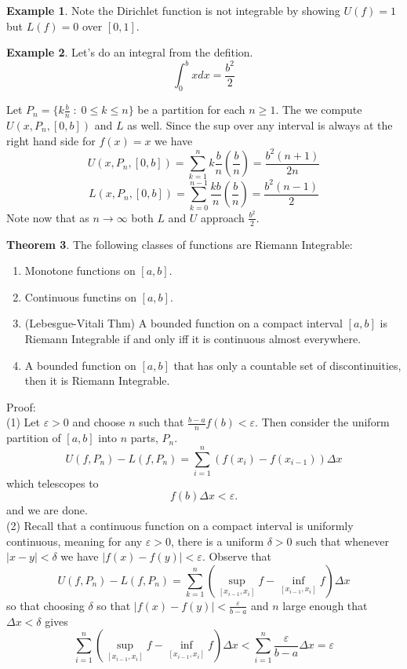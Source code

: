 \documentclass[12pt]{article}
\theoremstyle{definition}
\newtheorem{thm}{Theorem}
\newtheorem{ex}[thm]{Example}
\begin{document}
    \begin{ex}
	Note the Dirichlet function is not integrable by showing $ U(f)=1 $ but $ L(f)=0 $ over $ [0,1] $.
    \end{ex}

    \begin{ex}
    Let's do an integral from the defition.
    $$ \int_{0}^{b} x  dx = \frac{b^2}{2} $$ 
    \end{ex}

    Let $P_n= \{ k \frac{b}{n}\; :\; 0\leq k\leq n \}$ be a partition for each $n\geq 1$.
    The we compute $ U(x,P_n,[0,b]) $ and $ L $ as well.
    Since the sup over any interval is always at the right hand side for $ f(x)=x $ we have 
    $$ U(x,P_n,[0,b])= \sum_{k=1}^{n}k \frac{b}{n} \left( \frac{b}{n} \right) = \frac{b^2(n+1)}{2n}  $$ 
$$ L(x,P_n,[0,b]) = \sum_{k=0}^{n-1} \frac{kb}{n}\left( \frac{b}{n} \right)= \frac{b^2(n-1)}{2}  $$ 
Note now that as $ n \to \infty $ both $L$ and $U$ approach $ \frac{b^2}{2} $.

\begin{thm}
The following classes of functions are Riemann Integrable:
\begin{enumerate}
    \item Monotone functions on $[a,b]$.
    \item Continuous functins on $[a,b]$.
\item (Lebesgue-Vitali Thm) A bounded function on a compact interval $ [a,b] $ is Riemann Integrable if and only iff it is continuous almost everywhere.
\item A bounded function on $[a,b]$ that has only a countable set of discontinuities, then it is Riemann Integrable.
\end{enumerate}

\end{thm}


Proof:\\
(1) Let $ \varepsilon>0 $ and choose $n$ such that $ \frac{b-a}{n}f(b)<\varepsilon $. Then consider the uniform partition of $ [a,b] $ into $n$ parts, $ P_n $.
$$ U(f,P_n)-L(f,P_n) = \sum_{i=1}^{n} (f(x_i)-f(x_{i-1})) \Delta x$$ 
which telescopes to 
$$ f(b)\Delta x<\varepsilon.$$ 
and we are done.\\

(2) Recall that a continuous function on a compact interval is uniformly continuous, meaning for any $ \varepsilon>0 $, there is a uniform $ \delta>0 $ such that whenever $|x-y|<\delta$ we have $ |f(x)-f(y)|<\varepsilon $. Observe that
$$ U(f,P_n)-L(f,P_n) = \sum_{k=1}^{n} (\sup_{[x_{i-1},x_i]}f -  \inf_{[x_{i-1},x_i]}f)\Delta x $$ 
so that choosing $ \delta $ so that $ |f(x)-f(y)|< \frac{\varepsilon}{b-a} $ and $n$ large enough that $ \Delta x<\delta $  gives
$$ \sum_{i=1}^{n} (\sup_{[x_{i-1},x_i]}f -  \inf_{[x_{i-1},x_i]}f)\Delta x < \sum_{i=1}^{n} \frac{\varepsilon}{b-a} \Delta x =\varepsilon $$ \\
\end{document}
